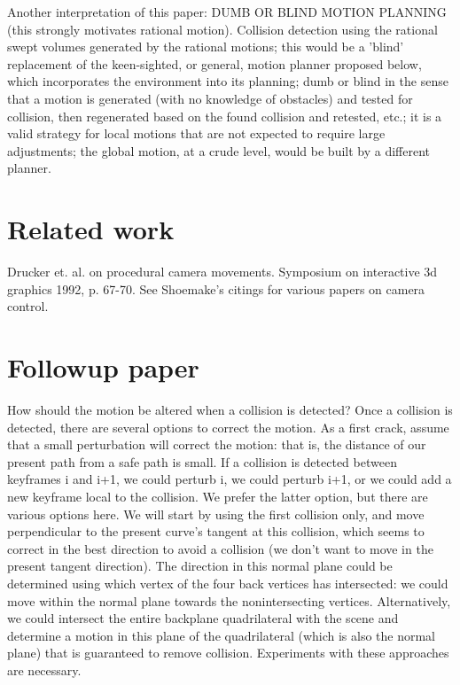 \documentclass[12pt]{article}
\begin{document}
Another interpretation of this paper: DUMB OR BLIND MOTION PLANNING (this 
strongly motivates rational motion).
Collision detection using the rational swept volumes generated by the rational motions;
this would be a 'blind' replacement of the keen-sighted, or general, motion planner 
proposed below, which incorporates the environment into its planning;
dumb or blind in the sense that a motion is generated (with no knowledge of obstacles)
and tested for collision, then regenerated
based on the found collision and retested, etc.;  it is a valid strategy for local
motions that are not expected to require large adjustments; the global motion, at a
crude level, would be built by a different planner.

\section{Related work}

Drucker et. al. \cite{drucker92} on procedural camera movements.
Symposium on interactive 3d graphics 1992, p. 67-70.
See Shoemake's citings for various papers on camera control.

\section{Followup paper}

How should the motion be altered when a collision is detected?
Once a collision is detected, there are several options to correct the motion.
As a first crack, assume that a small perturbation will correct the motion:
that is, the distance of our present path from a safe path is small.
If a collision is detected between keyframes i and i+1, we could perturb i,
we could perturb i+1, or we could add a new keyframe local to the collision.
We prefer the latter option, but there are various options here.
We will start by using the first collision only, and move perpendicular to the
present curve's tangent at this collision, which seems to correct in the best
direction to avoid a collision (we don't want to move in the present tangent direction).
The direction in this normal plane could be determined using which vertex of the four
back vertices has intersected: we could move within the normal plane 
towards the nonintersecting vertices.  
Alternatively, we could intersect the entire backplane quadrilateral with the scene
and determine a motion in this plane of the quadrilateral (which is also the normal plane)
that is guaranteed to remove collision.
Experiments with these approaches are necessary.
\end{document}
